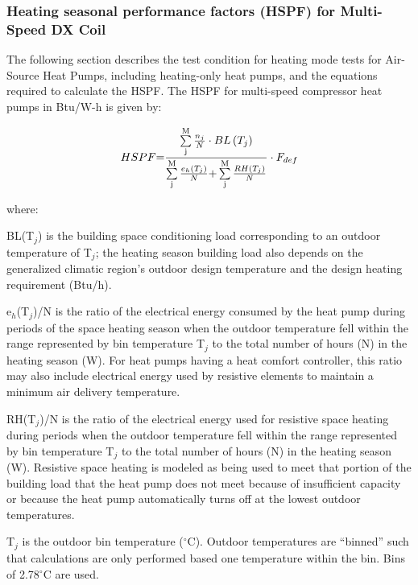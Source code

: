 \subsubsection{Heating seasonal performance factors (HSPF) for Multi-Speed DX Coil}\label{heating-seasonal-performance-factors-hspf-for-multi-speed-dx-coil}

The following section describes the test condition for heating mode tests for Air-Source Heat Pumps, including heating-only heat pumps, and the equations required to calculate the HSPF. The HSPF for multi-speed compressor heat pumps in Btu/W-h is given by:

\begin{equation}
HSPF{\rm{ = }}\frac{{\sum\limits_{\rm{j}}^{\rm{M}} {\frac{{{n_j}}}{N} \cdot BL\left( {{T_j}} \right)} }}{{\sum\limits_{\rm{j}}^{\rm{M}} {\frac{{{e_h}\left( {{T_j}} \right)}}{N}{\rm{ + }}} \sum\limits_{\rm{j}}^{\rm{M}} {\frac{{RH\left( {{T_j}} \right)}}{N}} }} \cdot {F_{def}}
\end{equation}

where:

BL(T\(_{j}\)) is the building space conditioning load corresponding to an outdoor temperature of T\(_{j}\); the heating season building load also depends on the generalized climatic region's outdoor design temperature and the design heating requirement (Btu/h).

e\(_{h}\)(T\(_{j}\))/N is the ratio of the electrical energy consumed by the heat pump during periods of the space heating season when the outdoor temperature fell within the range represented by bin temperature T\(_{j}\) to the total number of hours (N) in the heating season (W). For heat pumps having a heat comfort controller, this ratio may also include electrical energy used by resistive elements to maintain a minimum air delivery temperature.

RH(T\(_{j}\))/N is the ratio of the electrical energy used for resistive space heating during periods when the outdoor temperature fell within the range represented by bin temperature T\(_{j}\) to the total number of hours (N) in the heating season (W). Resistive space heating is modeled as being used to meet that portion of the building load that the heat pump does not meet because of insufficient capacity or because the heat pump automatically turns off at the lowest outdoor temperatures.

T\(_{j}\) is the outdoor bin temperature (\(^{\circ}\)C). Outdoor temperatures are ``binned'' such that calculations are only performed based one temperature within the bin. Bins of 2.78\(^{\circ}\)C are used.

